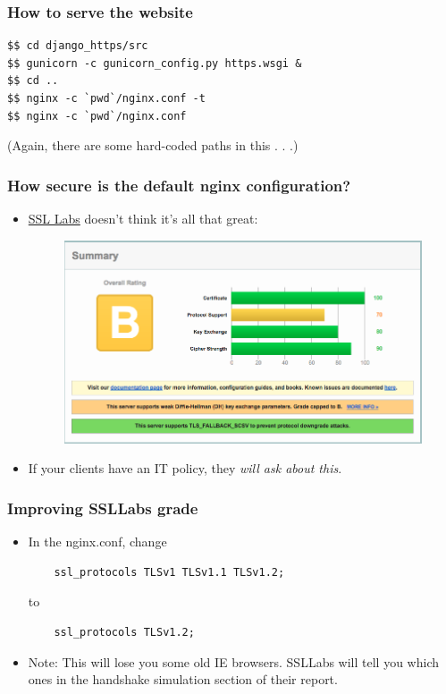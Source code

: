 \documentclass[9pt]{beamer}
\begin{document}
\begin{frame}[fragile]
\frametitle{How to serve the website}
\begin{verbatim}
$$ cd django_https/src
$$ gunicorn -c gunicorn_config.py https.wsgi &
$$ cd ..
$$ nginx -c `pwd`/nginx.conf -t
$$ nginx -c `pwd`/nginx.conf 
\end{verbatim}
(Again, there are some hard-coded paths in this . . .)
\end{frame}

\begin{frame}[fragile]
\frametitle{How secure is the default nginx configuration?}
\begin{itemize}
\item \href{https://www.ssllabs.com/ssltest/analyze.html}{SSL Labs} doesn't think it's all that great:

\begin{figure}
\includegraphics[scale=0.25]{figures/SSLLabsFirstGrade.png}
\end{figure}
\pause
\item If your clients have an IT policy, they \emph{will ask about this}.
\end{itemize}
\end{frame}

\begin{frame}[fragile]
\frametitle{Improving SSLLabs grade}
\begin{itemize}
\item In the nginx.conf, change 
\begin{verbatim}
    ssl_protocols TLSv1 TLSv1.1 TLSv1.2;
\end{verbatim}
to
\begin{verbatim}
    ssl_protocols TLSv1.2;
\end{verbatim}
\pause
\item Note: This will lose you some old IE browsers. SSLLabs will tell you which ones in the handshake simulation section of their report.
\end{itemize}
\end{frame}
\end{document}
